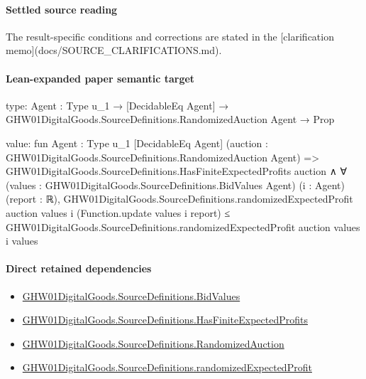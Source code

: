 \documentclass[10pt]{article}
\begin{document}
\paragraph{Settled source reading}
\begin{sloppypar}
The result-\allowbreak{}specific conditions and corrections are stated in the [clarification memo](docs/\allowbreak{}SOURCE\_\allowbreak{}CLARIFICATIONS.\allowbreak{}md).\allowbreak{}
\end{sloppypar}

\paragraph{Lean-expanded paper semantic target}
\begin{ReviewVerbatim}
type:
{Agent : Type u_1} → [DecidableEq Agent] → GHW01DigitalGoods.SourceDefinitions.RandomizedAuction Agent → Prop

value:
fun {Agent : Type u_1} [DecidableEq Agent] (auction : GHW01DigitalGoods.SourceDefinitions.RandomizedAuction Agent) =>
  GHW01DigitalGoods.SourceDefinitions.HasFiniteExpectedProfits auction ∧
    ∀ (values : GHW01DigitalGoods.SourceDefinitions.BidValues Agent) (i : Agent) (report : ℝ),
      GHW01DigitalGoods.SourceDefinitions.randomizedExpectedProfit auction values i (Function.update values i report) ≤
        GHW01DigitalGoods.SourceDefinitions.randomizedExpectedProfit auction values i values
\end{ReviewVerbatim}

\paragraph{Direct retained dependencies}
\begin{itemize}\raggedright
\item \hyperlink{paper-prerequisite-64512d0878f162c7}{GHW01\allowbreak{}Digital\allowbreak{}Goods.\allowbreak{}Source\allowbreak{}Definitions.\allowbreak{}Bid\allowbreak{}Values}
\item \hyperlink{governing-declaration-6f4fb994a88fffe0}{GHW01\allowbreak{}Digital\allowbreak{}Goods.\allowbreak{}Source\allowbreak{}Definitions.\allowbreak{}Has\allowbreak{}Finite\allowbreak{}Expected\allowbreak{}Profits}
\item \hyperlink{paper-prerequisite-093498a5a1839250}{GHW01\allowbreak{}Digital\allowbreak{}Goods.\allowbreak{}Source\allowbreak{}Definitions.\allowbreak{}Randomized\allowbreak{}Auction}
\item \hyperlink{governing-declaration-65535a0bd85a8721}{GHW01\allowbreak{}Digital\allowbreak{}Goods.\allowbreak{}Source\allowbreak{}Definitions.\allowbreak{}randomized\allowbreak{}Expected\allowbreak{}Profit}
\end{itemize}
\end{document}
